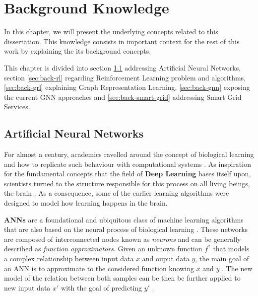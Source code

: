 \chapter{Background Knowledge} \label{chap:back}

In this chapter, we will present the underlying concepts related to this dissertation. This knowledge consists in important context for the rest of this work by explaining the its background concepts. \par
This chapter is divided into section \ref{sec:back-ann} addressing Artificial Neural Networks, section \ref{sec:back-rl} regarding Reinforcement Learning problem and algorithms, \ref{sec:back-grl} explaining Graph Representation Learning, \ref{sec:back-gnn} exposing the current \ac{GNN} approaches and \ref{sec:back-smart-grid} addressing Smart Grid Services..

\section{Artificial Neural Networks} \label{sec:back-ann}

For almost a century, academics ravelled around the concept of biological learning and how to replicate such behaviour with computational systems \cite{galuskinNeuralNetworksTheory2007, goodfellowDeepLearning2016} . As inspiration for the fundamental concepts that the field of \textbf{Deep Learning} bases itself upon, scientists turned to the structure responsible for this process on all living beings, the brain \cite{galuskinNeuralNetworksTheory2007, goodfellowDeepLearning2016}. As a consequence, some of the earlier learning algorithms were designed to model how learning happens in the brain. \par

\textbf{\acp{ANN}} are a foundational and ubiquitous class of machine learning algorithms that are also based on the neural process of biological learning \cite{galuskinNeuralNetworksTheory2007, goodfellowDeepLearning2016}. These networks are composed of interconnected nodes known as \textit{neurons} and can be generally described as \textit{function approximators}. Given an unknown function $f^*$ that models a complex relationship between input data $x$ and ouput data $y$, the main goal of an \ac{ANN} is to approximate to the considered function knowing $x$ and $y$ \cite{charniakIntroductionDeepLearning2018, goodfellowDeepLearning2016}. The new model of the relation between both samples can be then be further applied to new input data $x'$  with the goal of predicting $y'$ . \par

